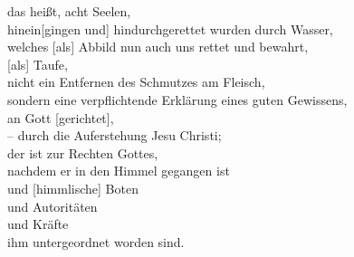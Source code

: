                         das heißt, acht Seelen, \\
                        hinein[gingen und] hindurchgerettet wurden durch Wasser, \\
                    welches [als] Abbild nun auch uns  rettet und bewahrt, \\
                        [als] Taufe, \\
                        nicht ein Entfernen des Schmutzes am Fleisch, \\
                            sondern eine  verpflichtende Erklärung eines guten Gewissens, \\
                            an Gott [gerichtet], \\
                        – durch die Auferstehung Jesu Christi; \\
                            der ist zur Rechten Gottes, \\
                            nachdem er in den Himmel gegangen ist \\
                            und [himmlische] Boten \\
                            und Autoritäten \\
                            und Kräfte \\
                            ihm untergeordnet worden sind. \\

